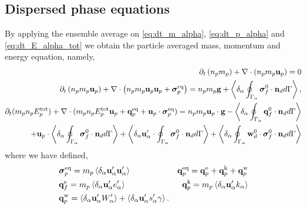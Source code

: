 \subsection{Dispersed phase equations}


By applying the ensemble average on \ref{eq:dt_m_alpha}, \ref{eq:dt_p_alpha} and \ref{eq:dt_E_alpha_tot} we obtain the particle averaged mass, momentum and energy equation, namely, 
\begin{align}
    \label{eq:dt_hybrid_mp}
    \partial_t \left(n_p m_p\right)
    + \mathbf{\nabla}\cdot \left(n_pm_p\textbf{u}_p
    \right)
    = 
    0\\
    \label{eq:dt_hybrid_up}
    \partial_t \left(n_p m_p \textbf{u}_p\right)
    + \mathbf{\nabla}\cdot \left(n_p
    m_p \textbf{u}_p \textbf{u}_p 
    + \bm{\sigma}_p^\text{eq}
    \right)
    = 
    n_p m_p \textbf{g}
    + \left<\delta_\alpha \oint_{\Gamma_\alpha} {\bm{\sigma}_f^0 \cdot \textbf{n}_d} d\Gamma\right>,\\
    \label{eq:dt_hybrid_Ep}
    \partial_t(m_p n_pE_p^\text{tot})
    + \mathbf{\nabla}\cdot(m_pn_p E_p^\text{tot} \textbf{u}_p 
    + \textbf{q}_p^\text{eq} 
    + \textbf{u}_p \cdot \bm{\sigma}_p^\text{eq})
    =  n_p m_p \textbf{u}_p\cdot  \textbf{g}
    -  \left<\delta_\alpha \oint_{\Gamma_\alpha} \textbf{q}_f^0 \cdot \textbf{n}_d d\Gamma\right>\nonumber\\
    + \textbf{u}_p \cdot\left<\delta_\alpha \oint_{\Gamma_\alpha} {\bm{\sigma}_f^0 \cdot \textbf{n}_d} d\Gamma\right>
    + \left<\delta_\alpha \textbf{u}_\alpha' \cdot\oint_{\Gamma_\alpha} \bm{\sigma}_f^0 \cdot \textbf{n}_d d\Gamma\right>
    + \left<\delta_\alpha \oint_{\Gamma_\alpha} {\textbf{w}_d^0 \cdot\bm{\sigma}_f^0 \cdot \textbf{n}_d} d\Gamma\right>
\end{align}
where we have defined, 
\begin{align*}
    &\bm{\sigma}_p^\text{eq}
    =  m_p\left<\delta_\alpha \textbf{u}_\alpha'\textbf{u}_\alpha'\right>
    &\textbf{q}_p^\text{eq}
    =\textbf{q}_p^\text{e} 
    +\textbf{q}_p^\text{k}  
    +\textbf{q}_p^\text{w}  
    \\
    &\textbf{q}_f^\text{e}
    = m_p \left<\delta_\alpha \textbf{u}_\alpha' e_\alpha'\right> 
    &\textbf{q}_p^\text{k}
    = m_p \left<\delta_\alpha \textbf{u}_\alpha' k_\alpha\right> 
    \\
    &\textbf{q}_p^\text{w}
    = 
     \left<\delta_\alpha \textbf{u}_\alpha'W_\alpha'\right>
    + \left<\delta_\alpha \textbf{u}_\alpha' s_\alpha' \gamma\right>.
\end{align*}
